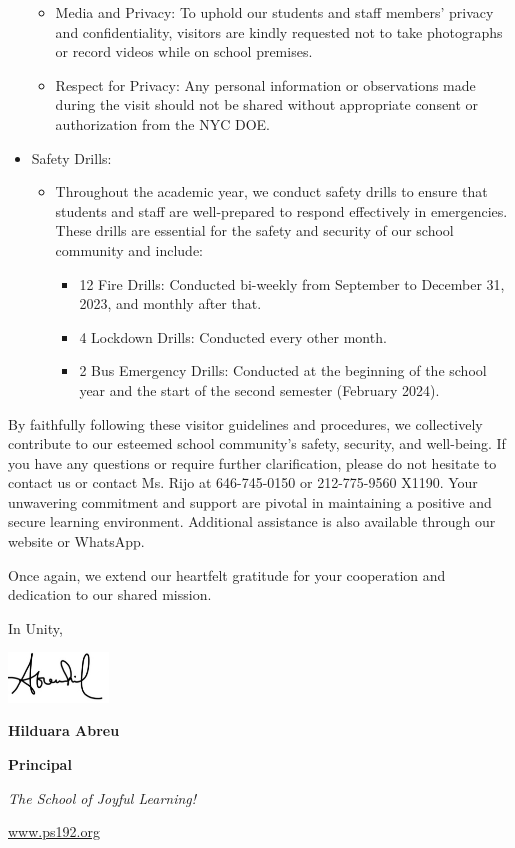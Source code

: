 \documentclass[12pt,letterpaper]{article}
\begin{document}
\begin{itemize}
		\begin{itemize}
		\item Media and Privacy: To uphold our students and staff members' privacy and confidentiality, visitors are kindly requested not to take photographs or record videos while on school premises.
		\item Respect for Privacy: Any personal information or observations made during the visit should not be shared without appropriate consent or authorization from the NYC DOE.
		\end{itemize}
	\item Safety Drills:
		\begin{itemize}
		\item Throughout the academic year, we conduct safety drills to ensure that students and staff are well-prepared to respond effectively in emergencies. These drills are essential for the safety and security of our school community and include:
			\begin{itemize}
			\item 12 Fire Drills: Conducted bi-weekly from September to December 31, 2023, and monthly after that.
			\item 4 Lockdown Drills: Conducted every other month.
			\item 2 Bus Emergency Drills: Conducted at the beginning of the school year and the start of the second semester (February 2024).
			\end{itemize}
		\end{itemize}
\end{itemize}
\pagebreak
\vspace*{1.5cm}
By faithfully following these visitor guidelines and procedures, we collectively contribute to our esteemed school community's safety, security, and well-being. If you have any questions or require further clarification, please do not hesitate to contact us or contact Ms. Rijo at 646-745-0150 or 212-775-9560 X1190. Your unwavering commitment and support are pivotal in maintaining a positive and secure learning environment. Additional assistance is also available through our website or WhatsApp.

Once again, we extend our heartfelt gratitude for your cooperation and dedication to our shared mission.

In Unity,

\includegraphics[width=0.2\textwidth]{hil_signature}

\textbf{Hilduara Abreu}

\textbf{Principal}

\textit{The School of Joyful Learning!}

\url{www.ps192.org}
\end{document}
